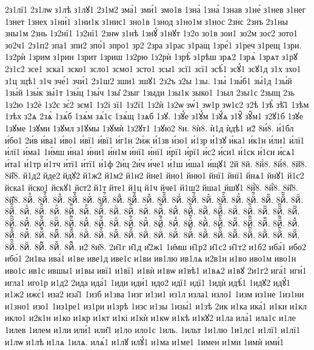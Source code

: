 {2з1лї1
2з1лѡ
з1лѣ
з1лꙋ1
2з1м2
зма́1
зми́1
змо1в
1зна̀
1зна́
1знав
з1не́
з1нев
з1нег
1знет
1знех
з1ни́1
з1ни1к
з1нис1
зно1в
1знод
з1но1м
з1нос
2знс
2знъ
2з1ны
зны1м
2знь
1з2нї1
1з2нї1
2знѡ
з1нѣ
1знꙋ́
з1нꙋт
1з2о
зо1в
зои1
зо2м
зос2
зото1
зо2ч1
2з1п2
зпа1
зпи2
зпо́1
зпро1
зр2
2зра
з1рас
з1ращ
1зре́1
з1реч
з1рещ
1зри.
1з2рѝ
1зрим
з1рин
1зрит
1зриш
1з2рю
1з2рѝ
1зрѣ̀
з1рѣш
зрѧ2
1зрѧ̀
1зрѧт
з1рꙋ
2з1с2
зсе1
зска1
зско1
зсло1
зсмо1
зсто1
зсы1
зсї1
зсї1
зсѣ́1
зсꙋ́1
зсꙋ1д
з1х
зхо1
з1ц
зцѣ1
з1ч
зче́1
зчи́1
2з1ш2
зши1
зшꙋ1
2з2ъ
з2ы
1зы.
1зы̀
1зы́б1
зы́1д
1зы́й
1зы́й
1зы́к
зы́1т
1зы́ц
1зы́ч
1зы̑
2зыг
1зыди
1зы1к
зыко1
1зыл
2зы1с
2зыщ
2зь
1з2ю
1з2ѐ
1з2є
зє́2
зєм1
1з2і
зї1
1з2ї1
1з2ѝ
1з2ѡ
зѡ́1
зѡ1р
зѡ1с2
з2ѣ
1зѣ̀
зѣ̑1
1зѣм
1зѣх
з2ѧ
2зѧ̀
1зѧ́б
1зѧ́м
зѧ́1с
1зѧ́щ
1зѧб
1зꙋ.
1зꙋ́е
з1ꙋ́м
1зꙋ́ѧ
з1ꙋ̑
зꙋ̑м1
з2ꙋ1б
1зꙋе
1зꙋме
1зꙋми
1зꙋмл
з1ꙋмы
1зꙋмѝ
1з2ꙋт1
1зꙋю2
8и.
8ѝ8.
ѝ1д
ѝдѣ1
и2́
8и́8.
и́1бл
и́бо1
2и́в
и́ва1
и́во1
и́вї1
и́вї1
и́г1н
2и́ж
и́1зв
и́зо1
и́1зр
и́1зꙋ
и́ка1
и́к1н
и́ли1
и́лї1
и́лї1
и́ма1
1и́мш
и́на1
и́ни1
и́н1м
и́нї1
и́нї1
и́рї1
и́рї1
и́с2
и́си1
и́1ск
и́1сн
и́сѧ1
и́та1
и́1тр
и́1тч
и́тї1
и́тї1
и́1ф
2и́ц
2и́ч
и́че1
и́1ш
и́ша1
и́щꙋ1
2й
8й.
8й̀8.
8й́8.
8й̈8.
8й̑8.
й1д2
йде2
йдꙋ2
й1ж2
й1м2
й1н2
йне1
йно1
йню1
йнї1
йнї1
йнѧ1
йнꙋ1
й1с2
йска1
йско1
йскꙋ1
йст2
й1т
йте1
й1ц
й1ч
йче1
й1ш2
йша1
йшꙋ1
8й҆̀8.
8й҆́8.
8й҆̈8.
8й҆̑8.
8йⷠ.
8йⷠ҇.
8йⷡ.
8йⷡ҇.
8йⷢ.
8йⷢ҇.
8йⷣ.
8йⷣ҇.
8йⷤ.
8йⷤ҇.
8йⷥ.
8йⷥ҇.
8йⷦ.
8йⷦ҇.
8йⷧ.
8йⷧ҇.
8йⷨ.
8йⷨ҇.
8йⷩ.
8йⷩ҇.
8йⷪ.
8йⷪ҇.
8йⷫ.
8йⷫ҇.
8йⷬ.
8йⷬ҇.
8йⷭ.
8йⷭ҇.
8йⷮ.
8йⷮ҇.
8йⷯ.
8йⷯ҇.
8йⷰ.
8йⷰ҇.
8йⷱ.
8йⷱ҇.
8йⷲ.
8йⷲ҇.
8йⷳ.
8йⷳ҇.
8йⷴ.
8йⷴ҇.
8йⷵ.
8йⷵ҇.
8йⷶ.
8йⷶ҇.
8йⷷ.
8йⷷ҇.
8йⷸ.
8йⷸ҇.
8йⷹ.
8йⷹ҇.
8йⷺ.
8йⷺ҇.
8йⷻ.
8йⷻ҇.
8йⷼ.
8йⷼ҇.
8йⷽ.
8йⷽ҇.
8йⷾ.
8йⷾ҇.
8йⷿ.
8йⷿ҇.
8йꙴ.
8йꙴ҇.
8йꙵ.
8йꙵ҇.
8йꙶ.
8йꙶ҇.
8йꙷ.
8йꙷ҇.
8йꙸ.
8йꙸ҇.
8йꙹ.
8йꙹ҇.
8йꙺ.
8йꙺ҇.
8йꙻ.
8йꙻ҇.
8й꙼.
8й꙼҇.
8й꙽.
8й꙽҇.
и2̑
8и̑8.
2и̑1г
и̑1д
и̑2ж1
1и̑мш
и̑1р2
и̑1с2
и̑1т2
и1б2
иба́1
ибо2
ибо́1
2и1ва
ива́1
и1ве
иве1д
иве1с
и1ви
ив1лю
ив1лѧ
и2в1н
и1во
иво1м
иво1н
иво1с
ив1с
ившы1
и1вы
ивї1
и1вї1
и1вѝ
и1вѡ
и1вѣ1
и1вѧ2
и1вꙋ
2и1г2
ига́1
иги́1
игла1
иго1р
и1д2
2ида
ида́1
1иди
иди́1
идо2
идї1
идї1
1идѝ
идѣ́1
1идꙋ2
идꙋ́1
и1ж2
ижє́1
иза2
иза̑1
1изб
и1зва
1изг
и1зи1
из1л
изла1
изло1
1изм
из1не
1из1ни
и1зно1
изо1
1из1ре1
из1ри
и1зрѣ
1изс
и1зы
1изы́1
и1зѣ
2ик
и1ка
ика́1
и1ки
и1кл
икло1
и2к1н
и1ко
и1кр
и1кт
и1кі
и1кѝ
и1кѡ
и1кѣ
и1кꙋ2
и1ла
ила́1
ила1с
и1ле
1илев
1илем
и1ли
или́1
или̑1
и1ло
ило1с
1иль.
1ильт
1и1лю
1и1лє1
и1лї1
и1лї1
и1лѡ
и1лѣ
и1лѧ
1илѧ.
илѧ́1
и1лꙋ
илꙋ́1
и1ма
и1ме1
1имен
и1ми
1имѝ
ими́1
}
